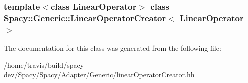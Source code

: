 \subsubsection*{template$<$class Linear\-Operator$>$ class Spacy\-::\-Generic\-::\-Linear\-Operator\-Creator$<$ Linear\-Operator $>$}



\-The documentation for this class was generated from the following file\-:\begin{DoxyCompactItemize}
\item 
/home/travis/build/spacy-\/dev/\-Spacy/\-Spacy/\-Adapter/\-Generic/linear\-Operator\-Creator.\-hh\end{DoxyCompactItemize}
